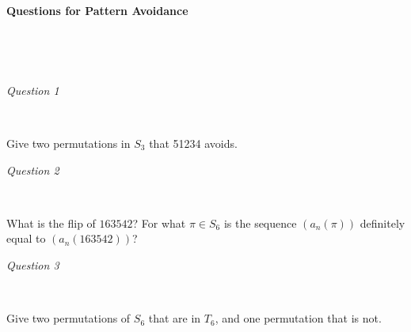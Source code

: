 \documentclass{article}
\begin{document}
\begin{center}
{\bf\Large {Questions for Pattern Avoidance}}
\end{center}


\

\


\emph{Question 1}

\


Give two permutations in $S_3$ that 51234 avoids. 

\vspace{4cm}


\emph{Question 2}

\
 
What is the flip of $163542$? For what $\pi \in S_6$ is the sequence $(a_n(\pi))$ definitely equal to $(a_n(163542))$?

\vspace{4cm}



\emph{Question 3}

\

Give two permutations of $S_6$ that are in $T_6$, and one permutation that is not.
\end{document}
